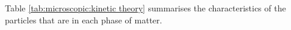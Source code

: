 \pagebreak
      \label{m38730*id308767}Table \ref{tab:microscopic:kinetic theory} summarises the characteristics of the particles that are in each phase of matter.
